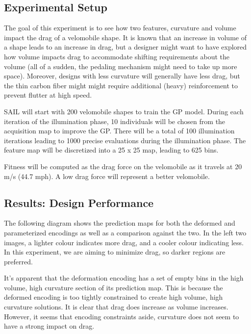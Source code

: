 \documentclass{sig-alternate}
\begin{document}
\subsection{Experimental Setup}
The goal of this experiment is to see how two features, curvature and volume impact the drag of a velomobile shape.
It is known that an increase in volume of a shape leads to an increase in drag, but a designer might want to have explored how volume impacts drag to accommodate shifting requirements about the volume (all of a sudden, the pedaling mechanism might need to take up more space).
Moreover, designs with less curvature will generally have less drag, but the thin carbon fiber might might require additional (heavy) reinforcement to prevent flutter at high speed. 

SAIL will start with 200 velomobile shapes to train the GP model. During each iteration of the illumination phase, 10 individuals will be chosen from the acquisition map to improve the GP.
There will be a total of 100 illumination iterations leading to 1000 precise evaluations during the illumination phase.
The feature map will be discretized into a 25 x 25 map, leading to 625 bins. 

Fitness will be computed as the drag force on the velomobile as it travels at 20 m/s (44.7 mph).
A low drag force will represent a better velomobile.

\subsection{Results: Design Performance}
The following diagram shows the prediction maps for both the deformed and parameterized encodings as well as a comparison against the two.
In the left two images, a lighter colour indicates more drag, and a cooler colour indicating less.
In this experiment, we are aiming to minimize drag, so darker regions are preferred.

\begin{figure}[htb]
\centering
{}
\label{fig:DesignPerformance}
\caption{}
\end{figure}

It's apparent that the deformation encoding has a set of empty bins in the high volume, high curvature section of its prediction map.
This is because the deformed encoding is too tightly constrained to create high volume, high curvature solutions.
It is clear that drag does increase as volume increases.
However, it seems that encoding constraints aside, curvature does not seem to have a strong impact on drag.
\end{document}
